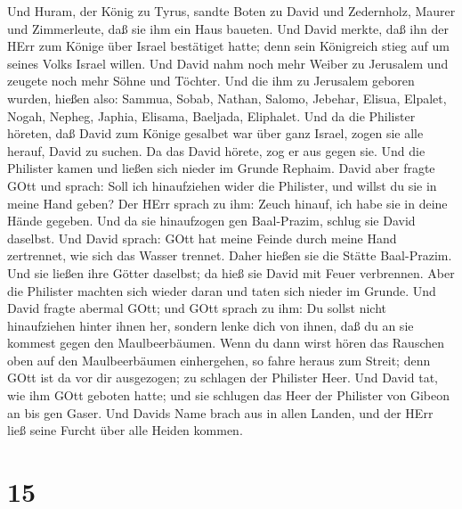  Und Huram, der König zu Tyrus, sandte Boten zu David und
Zedernholz, Maurer und Zimmerleute, daß sie ihm ein Haus baueten.
 Und David merkte, daß ihn der HErr zum Könige über Israel
bestätiget hatte; denn sein Königreich stieg auf um seines Volks Israel
willen.  Und David nahm noch mehr Weiber zu Jerusalem und
zeugete noch mehr Söhne und Töchter.  Und die ihm zu
Jerusalem geboren wurden, hießen also: Sammua, Sobab, Nathan, Salomo,
 Jebehar, Elisua, Elpalet,  Nogah, Nepheg,
Japhia,  Elisama, Baeljada, Eliphalet.  Und da
die Philister höreten, daß David zum Könige gesalbet war über ganz
Israel, zogen sie alle herauf, David zu suchen. Da das David hörete, zog
er aus gegen sie.  Und die Philister kamen und ließen sich
nieder im Grunde Rephaim.  David aber fragte GOtt und
sprach: Soll ich hinaufziehen wider die Philister, und willst du sie in
meine Hand geben? Der HErr sprach zu ihm: Zeuch hinauf, ich habe sie in
deine Hände gegeben.  Und da sie hinaufzogen gen
Baal-Prazim, schlug sie David daselbst. Und David sprach: GOtt hat meine
Feinde durch meine Hand zertrennet, wie sich das Wasser trennet. Daher
hießen sie die Stätte Baal-Prazim.  Und sie ließen ihre
Götter daselbst; da hieß sie David mit Feuer verbrennen. 
Aber die Philister machten sich wieder daran und taten sich nieder im
Grunde.  Und David fragte abermal GOtt; und GOtt sprach zu
ihm: Du sollst nicht hinaufziehen hinter ihnen her, sondern lenke dich
von ihnen, daß du an sie kommest gegen den Maulbeerbäumen. 
Wenn du dann wirst hören das Rauschen oben auf den Maulbeerbäumen
einhergehen, so fahre heraus zum Streit; denn GOtt ist da vor dir
ausgezogen; zu schlagen der Philister Heer.  Und David tat,
wie ihm GOtt geboten hatte; und sie schlugen das Heer der Philister von
Gibeon an bis gen Gaser.  Und Davids Name brach aus in
allen Landen, und der HErr ließ seine Furcht über alle Heiden kommen.

\hypertarget{section-14}{%
\section{15}\label{section-14}}

